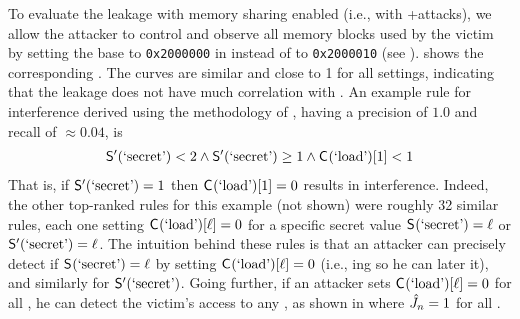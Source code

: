 To evaluate the leakage with memory sharing enabled (i.e., with
\Flush+\Reload attacks), we allow the attacker to control and observe
all memory blocks used by the victim by setting the base to
\texttt{0x2000000} in \proc instead of to \texttt{0x2000010} (see
).  
shows the corresponding \JaccardRand{\secretsSetSize}.  The
\JaccardRand{\secretsSetSize} curves are similar and close to 1 for
all settings, indicating that the leakage does not have much
correlation with \cacheLineNmbr.  An example rule for interference
derived using the methodology of , having a
precision of $1.0$ and recall of $\approx 0.04$, is
\begin{align}
  \mathsf{S}'_{}(\textrm{`secret'})< 2 \wedge \mathsf{S}'_{}(\textrm{`secret'})\ge 1 \wedge \mathsf{C}_{}(\textrm{`load'})[1]< 1
  \label{eqn:flush-reload-interference}
\end{align}
That is, if $\mathsf{S}'_{}(\textrm{`secret'})=1$ then $\mathsf{C}_{}(\textrm{`load'})[1]=0$
results in interference.  Indeed, the other top-ranked rules for this
example (not shown) were roughly 32 similar rules, each one setting
$\mathsf{C}_{}(\textrm{`load'})[\ell]=0$ for a specific secret value
$\mathsf{S}_{}(\textrm{`secret'})=\ell$ or
$\mathsf{S}'_{}(\textrm{`secret'})=\ell$.  The intuition behind these rules
is that an attacker can precisely detect if $\mathsf{S}_{}(\textrm{`secret'}) =
\ell$ by setting $\mathsf{C}_{}(\textrm{`load'})[\ell]=0$ (i.e.,
\Flush{}ing \block{\blockIdx} so he can later \Reload it), and
similarly for $\mathsf{S}'_{}(\textrm{`secret'})$.  Going further, if an
attacker sets $\mathsf{C}_{}(\textrm{`load'})[\ell] = 0$ for all \blockIdx,
he can detect the victim's access to any \block{\blockIdx}, as shown
in  where
$\hat{J}_{n}=1$ for all \secretsSetSize.

